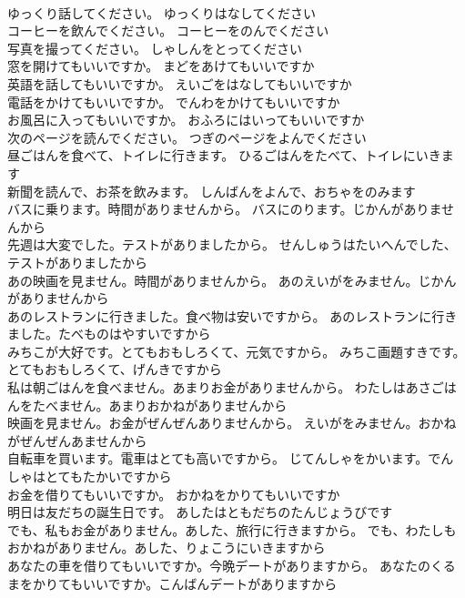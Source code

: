 \documentclass[8pt]{extreport}
\begin{document}
\begin{CJK}{UTF8}{min}
\\	ゆっくり話してください。	ゆっくりはなしてください 
\\	コーヒーを飲んでください。	コーヒーをのんでください 
\\	写真を撮ってください。	しゃしんをとってください 
\\	窓を開けてもいいですか。	まどをあけてもいいですか 
\\	英語を話してもいいですか。	えいごをはなしてもいいですか 
\\	電話をかけてもいいですか。	でんわをかけてもいいですか 
\\	お風呂に入ってもいいですか。	おふろにはいってもいいですか 
\\	次のページを読んでください。	つぎのページをよんでください 
\\	昼ごはんを食べて、トイレに行きます。	ひるごはんをたべて、トイレにいきます 
\\	新聞を読んで、お茶を飲みます。	しんばんをよんで、おちゃをのみます 
\\	バスに乗ります。時間がありませんから。	バスにのります。じかんがありませんから 
\\	先週は大変でした。テストがありましたから。	せんしゅうはたいへんでした、テストがありましたから 
\\	あの映画を見ません。時間がありませんから。	あのえいがをみません。じかんがありませんから 
\\	あのレストランに行きました。食べ物は安いですから。	あのレストランに行きました。たべものはやすいですから 
\\	みちこが大好です。とてもおもしろくて、元気ですから。	みちこ画題すきです。とてもおもしろくて、げんきですから 
\\	私は朝ごはんを食べません。あまりお金がありませんから。	わたしはあさごはんをたべません。あまりおかねがありませんから 
\\	映画を見ません。お金がぜんぜんありませんから。	えいがをみません。おかねがぜんぜんあませんから 
\\	自転車を買います。電車はとても高いですから。	じてんしゃをかいます。でんしゃはとてもたかいですから 
\\	お金を借りてもいいですか。	おかねをかりてもいいですか 
\\	明日は友だちの誕生日です。	あしたはともだちのたんじょうびです 
\\	でも、私もお金がありません。あした、旅行に行きますから。	でも、わたしもおかねがありません。あした、りょこうにいきますから 
\\	あなたの車を借りてもいいですか。今晩デートがありますから。	あなたのくるまをかりてもいいですか。こんばんデートがありますから 

\end{CJK}
\end{document}
